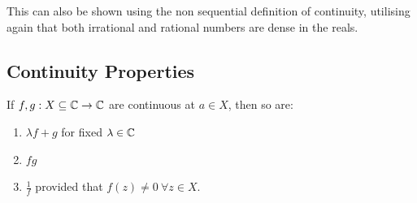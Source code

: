 \documentclass[../main.tex]{subfiles}
\begin{document}
\begin{example}
\begin{enumerate}
      This can also be shown using the non sequential definition of continuity, utilising again that both irrational and rational numbers are dense in the reals.
  \end{enumerate}
\end{example}
\subsection{Continuity Properties}
\begin{lemma}
  If $f, g: X \subseteq \mathbb{C} \to \mathbb{C}$ are continuous at $a \in X$, then so are:
  \label{continuityLaws}
  \begin{enumerate}
    \item $\lambda f + g$ for fixed $\lambda \in \mathbb{C}$
    \item $fg$
    \item $\frac{1}{f}$ provided that $f(z) \neq 0\ \forall z \in X$.
  \end{enumerate}
\end{lemma}
\end{document}
